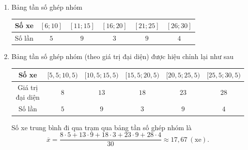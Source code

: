\begin{bt}
{\begin{enumerate}
			      Số xe trung bình đi qua trạm thu phí trong mỗi phút là
			      \allowdisplaybreaks
			      \begin{eqnarray*}
				      \overline{x}&=&\dfrac{6\cdot 2+7+9+10+11\cdot 4+12+13+15\cdot 3}{30}\\
				      &&+\dfrac{16+17+19+21\cdot 3+23\cdot 3+24+25\cdot 2+27+28+29\cdot 2}{30}\\
				      &\approx& 17{,}43\ (\text{xe}).
			      \end{eqnarray*}
			\item Bảng tần số ghép nhóm
			      \begin{center}
				      \begin{tabular}{|c|c|c|c|c|c|}
					      \hline Số xe  & {$[6; 10]$} & {$[11; 15]$} & {$[16; 20]$} & {$[21; 25]$} & {$[26; 30]$} \\
					      \hline Số lần & $5$         & $9$          & $3$          & $9$          & $4$          \\
					      \hline
				      \end{tabular}
			      \end{center}
			\item Bảng tần số ghép nhóm (theo giá trị đại diện) được hiệu chỉnh lại như sau
			      \begin{center}
				      \begin{tabular}{|c|c|c|c|c|c|}
					      \hline Số xe            & {$[5{,}5; 10{,}5)$} & {$[10{,}5; 15{,}5)$} & {$[15{,}5; 20{,}5)$} & {$[20{,}5; 25{,}5)$} & {$[25{,}5; 30{,}5)$} \\
					      \hline Giá trị đại diện & {$8$}               & {$13$}               & {$18$}               & {$23$}               & {$28$}               \\
					      \hline Số lần           & $5$                 & $9$                  & $3$                  & $9$                  & $4$                  \\
					      \hline
				      \end{tabular}
			      \end{center}
			      Số xe trung bình đi qua trạm qua bảng tần số ghép nhóm là
			      \[\overline{x}=\dfrac{8\cdot 5+13\cdot 9+18\cdot 3+23\cdot 9+28\cdot 4}{30}\approx 17{,}67\ (\text{xe}). \]
		\end{enumerate}
	}
\end{bt}

